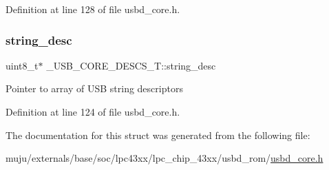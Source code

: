 Definition at line 128 of file usbd\+\_\+core.\+h.

\mbox{\label{struct___u_s_b___c_o_r_e___d_e_s_c_s___t_af785297629e79dec58480668d005c04e}} 
\subsubsection{\texorpdfstring{string\+\_\+desc}{string\_desc}}
{\footnotesize\ttfamily uint8\+\_\+t$\ast$ \+\_\+\+U\+S\+B\+\_\+\+C\+O\+R\+E\+\_\+\+D\+E\+S\+C\+S\+\_\+\+T\+::string\+\_\+desc}

Pointer to array of U\+SB string descriptors 

Definition at line 124 of file usbd\+\_\+core.\+h.



The documentation for this struct was generated from the following file\+:\begin{DoxyCompactItemize}
\item 
muju/externals/base/soc/lpc43xx/lpc\+\_\+chip\+\_\+43xx/usbd\+\_\+rom/\hyperlink{usbd__core_8h}{usbd\+\_\+core.\+h}\end{DoxyCompactItemize}

